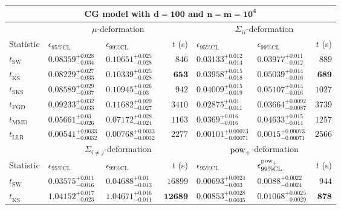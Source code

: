 \begin{tabular}{l|llr|llr}
	\toprule
	\multicolumn{7}{c}{{\bf CG model with $\mathbf{d=100}$ and $\mathbf{n=m=10^{4}}$}} \\
	\toprule
	\multicolumn{1}{c}{} & \multicolumn{3}{c}{$\mu$-deformation} & \multicolumn{3}{c}{$\Sigma_{ii}$-deformation} \\
	Statistic & $\epsilon_{95\%\mathrm{CL}}$ & $\epsilon_{99\%\mathrm    {CL}}$ & $t$ (s) & $\epsilon_{95\%\mathrm{CL}}$ & $\epsilon_{99\%\mathrm{CL}}$ & $t$ (s) \\
	\midrule
	$t_{\mathrm{SW}}$ & $0.08359_{-0.034}^{+0.028}$ & $0.10651_{-0.028}^{+0.025}$ & $846$ & $0.03133_{-0.014}^{+0.012}$ & $0.03977_{-0.012}^{+0.011}$ & $889$ \\
	$t_{\overline{\mathrm{KS}}}$ & $0.08229_{-0.033}^{+0.027}$ & $0.10339_{-0.028}^{+0.025}$ & ${\mathbf{653}}$ & $0.03958_{-0.018}^{+0.015}$ & $0.05039_{-0.016}^{+0.014}$ & ${\mathbf{689}}$ \\
	$t_{\mathrm{SKS}}$ & $0.08589_{-0.037}^{+0.029}$ & $0.10945_{-0.03}^{+0.026}$ & $942$ & $0.04009_{-0.019}^{+0.015}$ & $0.05107_{-0.016}^{+0.014}$ & $1027$ \\
	$t_{\mathrm{FGD}}$ & $0.09233_{-0.033}^{+0.032}$ & $0.11682_{-0.027}^{+0.029}$ & $3410$ & ${\mathbf{0.02875_{-0.011}^{+0.01}}}$ & ${\mathbf{0.03664_{-0.0087}^{+0.0092}}}$ & $3739$ \\
	$t_{\mathrm{MMD}}$ & ${\mathbf{0.05661_{-0.026}^{+0.03}}}$ & ${\mathbf{0.07172_{-0.024}^{+0.028}}}$ & $1163$ & $0.0369_{-0.016}^{+0.016}$ & $0.04633_{-0.014}^{+0.015}$ & $1257$ \\
	$t_{\mathrm{LLR}}$ & $0.00541_{-0.0032}^{+0.0033}$ & $0.00768_{-0.0032}^{+0.0033}$ & $2277$ & $0.00101_{-0.00071}^{+0.00073}$ & $0.0015_{-0.00071}^{+0.00073}$ & $2566$ \\
	\toprule
	\multicolumn{1}{c}{} & \multicolumn{3}{c}{$\Sigma_{i\neq j}$-deformation} & \multicolumn{3}{c}{$\rm{pow}_{+}$-deformation} \\
	Statistic & $\epsilon_{95\%\mathrm{CL}}$ & $\epsilon_{99\%\mathrm{CL}}$ & $t$ (s) & $\epsilon_{95\%\mathrm{CL}}$ & $\epsilon^{\rm   {pow}_{+}}_{99\%\mathrm{CL}}$ & $t$ (s) \\
	\midrule
	$t_{\mathrm{SW}}$ & $0.03575_{-0.016}^{+0.011}$ & $0.04688_{-0.013}^{+0.01}$ & $16899$ & $0.00693_{-0.003}^{+0.0024}$ & $0.0088_{-0.0024}^{+0.0022}$ & $944$ \\
	$t_{\overline{\mathrm{KS}}}$ & $1.04152_{-0.023}^{+0.017}$ & $1.04671_{-0.011}^{+0.016}$ & ${\mathbf{12689}}$ & $0.00853_{-0.0035}^{+0.0028}$ & $0.01068_{-0.0029}^{+0.0025}$ & ${\mathbf{878}}$ \\

\end{tabular}

